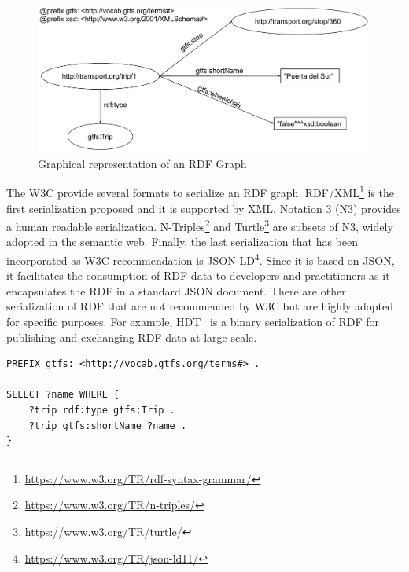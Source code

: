 \begin{figure}[!ht]
\centering
\includegraphics[width=\textwidth]{figures/state-of-the-art/RDF.pdf}
\caption{Graphical representation of an RDF Graph}
\label{fig:soa_rdf_example}
\end{figure}


The W3C provide several formats to serialize an RDF graph. RDF/XML\footnote{\url{https://www.w3.org/TR/rdf-syntax-grammar/}} is the first serialization proposed and it is supported by XML. Notation 3 (N3) provides a human readable serialization. N-Triples\footnote{\url{https://www.w3.org/TR/n-triples/}} and Turtle\footnote{\url{https://www.w3.org/TR/turtle/}} are subsets of N3, widely adopted in the semantic web. Finally, the last serialization that has been incorporated as W3C recommendation is JSON-LD\footnote{\url{https://www.w3.org/TR/json-ld11/}}. Since it is based on JSON, it facilitates the consumption of RDF data to developers and practitioners as it encapsulates the RDF in a standard JSON document. There are other serialization of RDF that are not recommended by W3C but are highly adopted for specific purposes. For example, HDT~\citep{fernandez2013binary} is a binary serialization of RDF for publishing and exchanging RDF data at large scale.

\begin{lstlisting}[float,caption=Example of SPARQL query,frame=tlrb,label={list:soa_sparql_example}, columns=fullflexible]
PREFIX gtfs: <http://vocab.gtfs.org/terms#> .

SELECT ?name WHERE {
    ?trip rdf:type gtfs:Trip .
    ?trip gtfs:shortName ?name .
}
\end{lstlisting}

